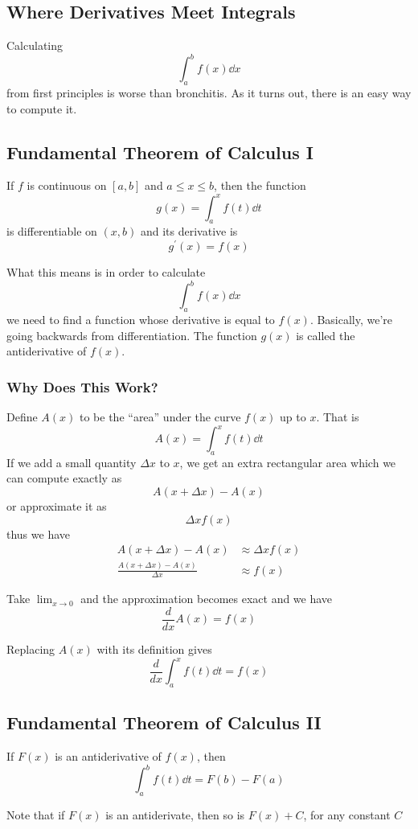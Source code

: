 \documentclass[12pt]{article}
\begin{document}
\subsection*{Where Derivatives Meet Integrals}
Calculating \[ \int_a^b f(x) \dd x \] from first principles is worse than bronchitis. As it turns out, there is an easy way to compute it.

\subsection*{Fundamental Theorem of Calculus I}
If $f$ is continuous on $[a,b]$ and $a \leq x \leq b$, then the function \[ g(x) = \int_a^x f(t) \dd t \] is differentiable on $(x,b)$ and its derivative is \[ g^\prime(x) = f(x) \]

What this means is in order to calculate \[ \int_a^b f(x) \dd x \] we need to find a function whose derivative is equal to $f(x)$. Basically, we're going backwards from differentiation. The function $g(x)$ is called the antiderivative of $f(x)$.

\subsubsection*{Why Does This Work?}
Define $A(x)$ to be the ``area'' under the curve $f(x)$ up to $x$. That is \[ A(x) = \int_a^x f(t) \dd t \] If we add a small quantity $\Delta x$ to $x$, we get an extra rectangular area which we can compute exactly as \[ A(x+\Delta x) - A(x) \] or approximate it as \[ \Delta xf(x) \] thus we have
\begin{align*}
A(x+\Delta x) - A(x) &\approx \Delta xf(x)\\
\frac{A(x+\Delta x) - A(x)}{\Delta x} &\approx f(x)
\end{align*}

Take $\displaystyle\lim_{x\to 0}$ and the approximation becomes exact and we have \[ \frac{d}{dx}A(x) = f(x) \]

Replacing $A(x)$ with its definition gives \[ \frac{d}{dx}\int_a^x f(t) \dd t = f(x) \]

\subsection*{Fundamental Theorem of Calculus II}
If $F(x)$ is an antiderivative of $f(x)$, then \[ \int_a^b f(t) \dd t = F(b) - F(a) \]

Note that if $F(x)$ is an antiderivate, then so is $F(x) + C$, for any constant $C$
\end{document}
